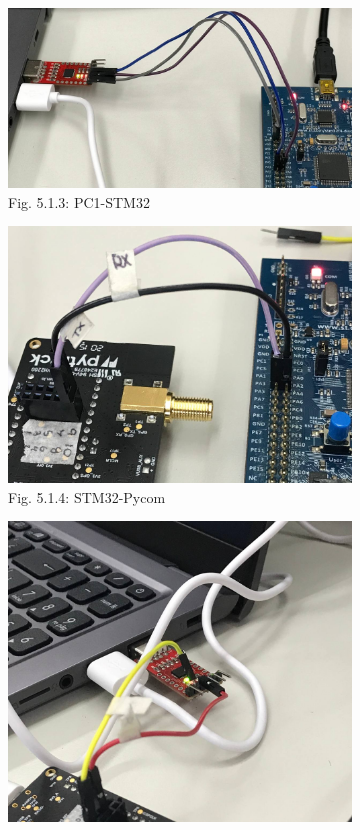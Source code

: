 \documentclass[12pt]{article}
\begin{document}
\begin{figure}[ht]
  \centering
  \begin{subfigure}[b]{0.35\linewidth}
    \includegraphics[width=\linewidth]{images/SMT32-PyCom-1.png}
    \caption{Fig. 5.1.3: PC1-STM32}
  \end{subfigure}
  \begin{subfigure}[b]{0.4\linewidth}
    \includegraphics[width=\linewidth]{images/SMT32-PyCom-2.png}
    \caption{Fig. 5.1.4: STM32-Pycom}
  \end{subfigure}
  \begin{subfigure}[c]{0.35\linewidth}
    \includegraphics[width=\linewidth]{images/SMT32-PyCom-3.png}

\end{subfigure}
\end{figure}
\end{document}
